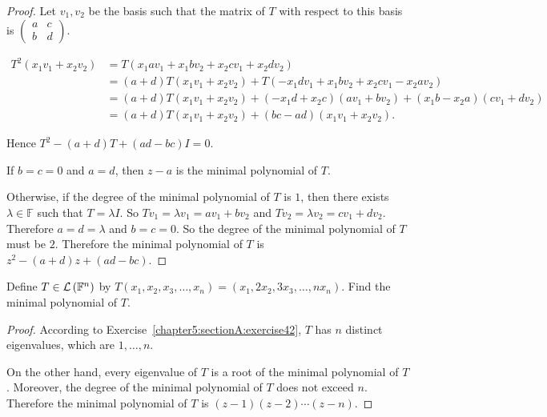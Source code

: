 \begin{proof}
    Let $v_{1}, v_{2}$ be the basis such that the matrix of $T$ with respect to this basis is $\begin{pmatrix}a & c \\ b & d\end{pmatrix}$.

    \begin{align*}
        T^{2}(x_{1}v_{1} + x_{2}v_{2}) & = T(x_{1}av_{1} + x_{1}bv_{2} + x_{2}cv_{1} + x_{2}dv_{2})                                                     \\
                                       & = (a + d)T(x_{1}v_{1} + x_{2}v_{2}) + T(-x_{1}dv_{1} + x_{1}bv_{2} + x_{2}cv_{1} - x_{2}av_{2})                \\
                                       & = (a + d)T(x_{1}v_{1} + x_{2}v_{2}) + (-x_{1}d + x_{2}c)(av_{1} + bv_{2}) + (x_{1}b - x_{2}a)(cv_{1} + dv_{2}) \\
                                       & = (a + d)T(x_{1}v_{1} + x_{2}v_{2}) + (bc - ad)(x_{1}v_{1} + x_{2}v_{2}).
    \end{align*}

    Hence $T^{2} - (a + d)T + (ad - bc)I = 0$.

    If $b = c = 0$ and $a = d$, then $z - a$ is the minimal polynomial of $T$.

    Otherwise, if the degree of the minimal polynomial of $T$ is $1$, then there exists $\lambda\in\mathbb{F}$ such that $T = \lambda I$. So $Tv_{1} = \lambda v_{1} = av_{1} + bv_{2}$ and $Tv_{2} = \lambda v_{2} = cv_{1} + dv_{2}$. Therefore $a = d = \lambda$ and $b = c = 0$. So the degree of the minimal polynomial of $T$ must be $2$. Therefore the minimal polynomial of $T$ is $z^{2} - (a + d)z + (ad - bc)$.
\end{proof}
\newpage

\begin{exercise}
    Define $T\in\mathcal{L}\left({\mathbb{F}^{n}}\right)$ by $T(x_{1}, x_{2}, x_{3}, \ldots, x_{n}) = (x_{1}, 2x_{2}, 3x_{3}, \ldots, nx_{n})$. Find the minimal polynomial of $T$.
\end{exercise}

\begin{proof}
    According to Exercise~\ref{chapter5:sectionA:exercise42}, $T$ has $n$ distinct eigenvalues, which are $1, \ldots, n$.

    On the other hand, every eigenvalue of $T$ is a root of the minimal polynomial of $T$. Moreover, the degree of the minimal polynomial of $T$ does not exceed $n$. Therefore the minimal polynomial of $T$ is $(z - 1)(z - 2)\cdots (z - n)$.
\end{proof}
\newpage

